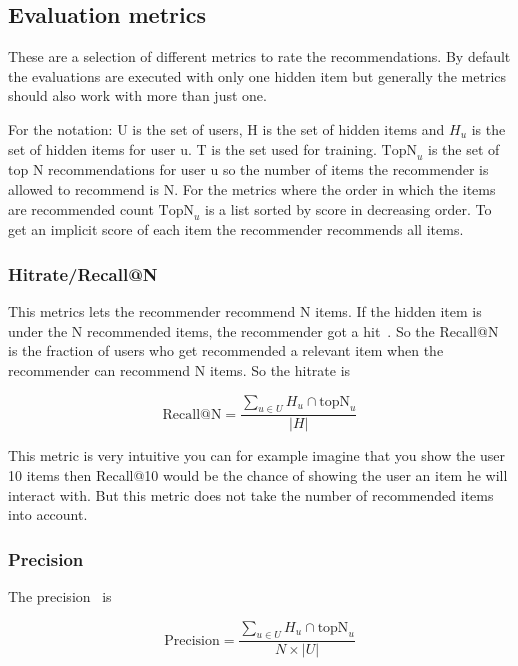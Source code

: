 \subsection{Evaluation metrics}
\label{evaluationmetrics}

These are a selection of different metrics to rate the recommendations.
By default the evaluations are executed with only one hidden item
but generally the metrics should also work with more than just one.

For the notation: U is the set of users, H is the set of hidden items
and \(H_u\) is the set of hidden items for user u. T is the set used for 
training. \(\text{TopN}_u\)
is the set of top N recommendations for user u so the number of items
the recommender is allowed to recommend is N. For the metrics where
the order in which the items are recommended count \(\text{TopN}_u\)
is a list sorted by score in decreasing order.
To get an implicit score of each item the recommender recommends all
items.


\subsubsection{Hitrate/Recall@N}

This metrics lets the recommender recommend N items. If the hidden
item is under the N recommended items, the recommender got a 
hit~\cite{Karypis:2001:EIT:502585.502627, Sarwar00applicationof}.
So the Recall@N is the fraction of users who get recommended a
relevant item when the recommender can recommend N items.
So the hitrate is 

\begin{equation} 
\text{Recall@N}=\frac{\sum_{u \in U} H_u \cap \text{topN}_u}{|H|}
\end{equation}


This metric is very intuitive you can for example imagine that you
show the user 10 items then Recall@10 would be the chance of showing
the user an item he will interact with. But this metric does not take
the number of recommended items into account.


\subsubsection{Precision}

The precision~\cite{Sarwar00applicationof} is 

\begin{equation} 
\text{Precision}=\frac{\sum_{u \in U} H_u \cap \text{topN}_u}{N \times |U|}
\end{equation}


